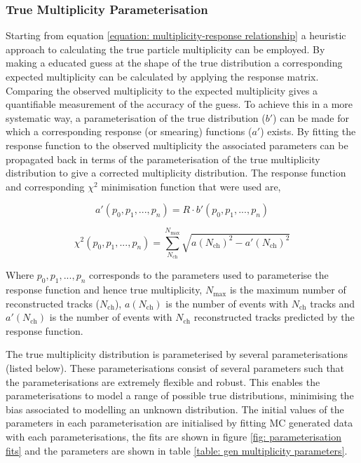 \subsubsection{True Multiplicity Parameterisation}
\label{subsection: charged particle event multiplicity, true multiplicity parameterisation}

Starting from equation \ref{equation: multiplicity-response relationship} a heuristic approach to calculating the true particle multiplicity can be employed. By making a educated guess at the shape of the true distribution a corresponding expected multiplicity can be calculated by applying the response matrix. Comparing the observed multiplicity to the expected multiplicity gives a quantifiable measurement of the accuracy of the guess. To achieve this in a more systematic way, a parameterisation of the true distribution ($b'$) can be made for which a corresponding response (or smearing) functions ($a'$) exists. By fitting the response function to the observed multiplicity the associated parameters can be propagated back in terms of the parameterisation of the true multiplicity distribution to give a corrected multiplicity distribution. The response function and corresponding $\chi^2$ minimisation function that were used are,

\begin{equation}
	a'(p_0, p_1, ..., p_n) = R \cdot b'(p_0, p_1, ..., p_n)
\end{equation}

\begin{equation}
	\chi^2(p_0, p_1, ..., p_n) = \sum^{N_\mathrm{max}}_{N_\mathrm{ch}} \sqrt{a(N_\mathrm{ch})^2 - a'(N_\mathrm{ch})^2}
	\label{equation: response function minimisation}
\end{equation}

Where $p_0, p_1, ..., p_n$ corresponds to the parameters used to parameterise the response function and hence true multiplicity, $N_\mathrm{max}$ is the maximum number of reconstructed tracks ($N_\mathrm{ch}$), $a(N_\mathrm{ch})$ is the number of events with $N_\mathrm{ch}$ tracks and $a'(N_\mathrm{ch})$ is the number of events with $N_\mathrm{ch}$ reconstructed tracks predicted by the response function.


The true multiplicity distribution is parameterised by several parameterisations (listed below). These parameterisations consist of several parameters such that the parameterisations are extremely flexible and robust. This enables the parameterisations to model a range of possible true distributions, minimising the bias associated to modelling an unknown distribution. The initial values of the parameters in each parameterisation are initialised by fitting MC generated data with each parameterisations, the fits are shown in figure \ref{fig: parameterisation fits} and the parameters are shown in table \ref{table: gen multiplicity parameters}.

